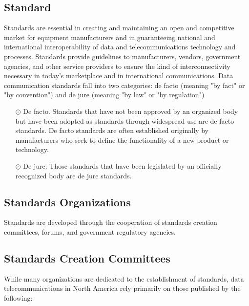 \subsection*{Standard}
Standards are essential in creating and maintaining an open and competitive market for equipment manufacturers and in guaranteeing national and international interoperability of data and telecommunications technology and processes. Standards provide guidelines to manufacturers, vendors, government agencies, and other service providers to ensure the kind of interconnectivity necessary in today's marketplace and in international communications. Data communication standards fall into two categories: de facto (meaning "by fact" or "by convention") and de jure (meaning "by law" or "by regulation")
\begin{itemize}
  \item[$\odot$] De facto. Standards that have not been approved by an organized body but have been adopted as standards through widespread use are de facto standards. De facto standards are often established originally by manufacturers who seek to define the functionality of a new product or technology. 
  \item[$\odot$] De jure. Those standards that have been legislated by an officially recognized body are de jure standards.
\end{itemize}

\subsection{Standards Organizations}
Standards are developed through the cooperation of standards creation committees, forums, and government regulatory agencies.

\subsection*{Standards Creation Committees}
While many organizations are dedicated to the establishment of standards, data telecommunications in North America rely primarily on those published by the following:

